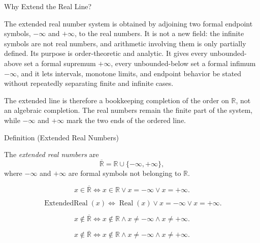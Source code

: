\begin{topicbox}{Why Extend the Real Line?}
\begin{exposition}
The extended real number system is obtained by adjoining two formal endpoint
symbols, $-\infty$ and $+\infty$, to the real numbers. It is not a new field:
the infinite symbols are not real numbers, and arithmetic involving them is
only partially defined. Its purpose is order-theoretic and analytic. It gives
every unbounded-above set a formal supremum $+\infty$, every unbounded-below
set a formal infimum $-\infty$, and it lets intervals, monotone limits, and
endpoint behavior be stated without repeatedly separating finite and infinite
cases.

The extended line is therefore a bookkeeping completion of the order on
$\mathbb{R}$, not an algebraic completion. The real numbers remain the finite
part of the system, while $-\infty$ and $+\infty$ mark the two ends of the
ordered line.
\end{exposition}
\end{topicbox}

\begin{definitionbox}{Definition (Extended Real Numbers)}
\begin{definition}
\label{def:extended-real-numbers}
The \emph{extended real numbers} are
\[
\overline{\mathbb{R}}=\mathbb{R}\cup\{-\infty,+\infty\},
\]
where $-\infty$ and $+\infty$ are formal symbols not belonging to
$\mathbb{R}$.
\end{definition}
\end{definitionbox}
\begin{remark*}
\[
x\in\overline{\mathbb{R}}
\Longleftrightarrow
x\in\mathbb{R}\lor x=-\infty\lor x=+\infty.
\]
\end{remark*}
\begin{remark*}
\[
\operatorname{ExtendedReal}(x)\Longleftrightarrow
\operatorname{Real}(x)\lor x=-\infty\lor x=+\infty.
\]
\end{remark*}
\begin{remark*}
\[
x\notin\overline{\mathbb{R}}
\Longleftrightarrow
x\notin\mathbb{R}\land x\ne-\infty\land x\ne+\infty.
\]
\end{remark*}

\begin{remark*}
\[
x\notin\overline{\mathbb{R}}
\Longleftrightarrow
x\notin\mathbb{R}\land x\ne-\infty\land x\ne+\infty.
\]
\end{remark*}

